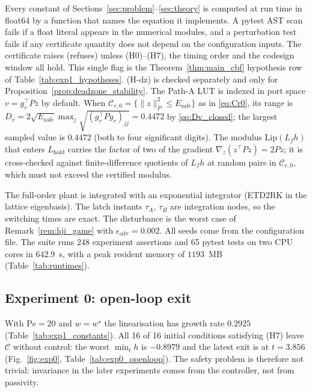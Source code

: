 Every constant of Sections~\ref{sec:problem}--\ref{sec:theory} is computed at run time in float64 by a function that
names the equation it implements. A pytest AST scan fails if a float literal appears in the numerical modules, and a
perturbation test fails if any certificate quantity does not depend on the configuration inputs. The certificate raises
(refuses) unless (H0)--(H7), the timing order and the codesign window all hold. This single flag is the
Theorem~\ref{thm:main_cbf} hypothesis row of Table~\ref{tab:exp1_hypotheses}. (H-dz) is checked separately and only
for Proposition~\ref{prop:deadzone_stability}. The Path-A LUT is indexed in port space \(v = g_r^\top P z\) by default.
When \(\mathcal C_{r,0} = \{\|z\|_P^2 \le E_{\mathrm{safe}}\}\) as in \eqref{eq:Cr0}, its range is
\(D_v = 2\sqrt{E_{\mathrm{safe}}}\max_j \sqrt{(g_r^\top P g_r)_{jj}} = 0.4472\) by \eqref{eq:Dv_closed}; the largest
sampled value is \(0.4472\) (both to four significant digits).
The modulus \(\mathrm{Lip}(L_fh)\) that enters \(L_{\mathrm{hold}}\) carries the factor of two of the gradient
\(\nabla_z(z^\top P z) = 2Pz\); it is cross-checked against finite-difference quotients of \(L_fh\) at random pairs in
\(\mathcal C_{r,0}\), which must not exceed the certified modulus.

The full-order plant is integrated with an exponential integrator (ETD2RK in the lattice eigenbasis). The latch
instants \(\tau_A\), \(\tau_B\) are integration nodes, so the switching times are exact. The disturbance is the worst
case of Remark~\ref{rem:hji_game} with \(\epsilon_{\mathrm{adv}} = 0.002\). All seeds come from the configuration
file. The suite runs 248 experiment assertions and 65 pytest tests on two CPU cores in
\(642.9\)~s, with a peak resident memory of \(1193\)~MB (Table~\ref{tab:runtimes}).





\subsection{Experiment 0: open-loop exit}
With \(\mathrm{Pe} = 20\) and \(w = w^\star\) the linearisation has growth rate \(0.2925\)
(Table~\ref{tab:exp1_constants}). All 16 of
16 initial conditions satisfying (H7) leave \(\mathcal C\) without control: the worst \(\min_t h\) is
\(-0.8979\) and the latest exit is at \(t = 3.856\) (Fig.~\ref{fig:exp0}, Table~\ref{tab:exp0_openloop}).
The safety problem is therefore not trivial: invariance in the later experiments comes from the controller, not from
passivity.

